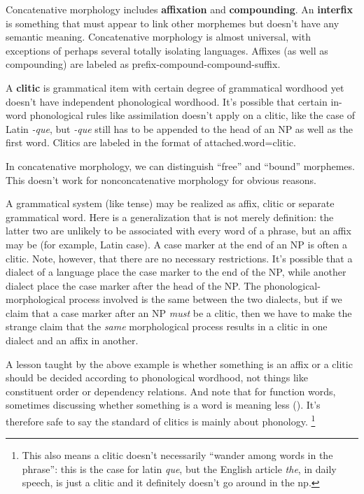 \documentclass[UTF8, a4paper, oneside, scheme=plain]{ctexart}
\newcommand*{\concept}[1]{\textbf{#1}}
\newcommand*{\corpus}[1]{\emph{#1}}
\begin{document}
Concatenative morphology includes \concept{affixation} and \concept{compounding}.
An \concept{interfix} is something that must appear to link other morphemes 
but doesn't have any semantic meaning.
Concatenative morphology is almost universal, 
with exceptions of perhaps several totally isolating languages.
Affixes (as well as compounding) are labeled as prefix-compound-compound-suffix.

A \concept{clitic} is grammatical item with certain degree of grammatical wordhood 
yet doesn't have independent phonological wordhood.
It's possible that certain in-word phonological rules like assimilation doesn't apply on a clitic,
like the case of Latin \corpus{-que}, 
but \corpus{-que} still has to be appended to
the head of an NP as well as the first word.
Clitics are labeled in the format of attached.word=clitic. 

In concatenative morphology, we can distinguish ``free'' and ``bound'' morphemes. 
This doesn't work for nonconcatenative morphology for obvious reasons.

A grammatical system (like tense) may be realized as affix, clitic or separate grammatical word. 
Here is a generalization that is not merely definition:
the latter two are unlikely to be associated with every word of a phrase, 
but an affix may be (for example, Latin case). 
A case marker at the end of an NP is often a clitic. 
Note, however, that there are no necessary restrictions. 
It's possible that a dialect of a language place the case marker to the end of the NP, 
while another dialect place the case marker after the head of the NP. 
The phonological-morphological process involved is the same between the two dialects, 
but if we claim that a case marker after an NP \emph{must} be a clitic, 
then we have to make the strange claim that 
the \emph{same} morphological process results in a clitic in one dialect and an affix in another.

A lesson taught by the above example is 
whether something is an affix or a clitic should be decided according to phonological wordhood, 
not things like constituent order or dependency relations. 
And note that for function words,
sometimes discussing whether something is a word is meaning less ().
It's therefore safe to say the standard of clitics is mainly about phonology.%
\footnote{
    This also means a clitic doesn't necessarily ``wander among words in the phrase'':
    this is the case for latin \corpus{que},
    but the English article \corpus{the}, 
    in daily speech, is just a clitic 
    and it definitely doesn't go around in the \ac{np}.
}
\end{document}
